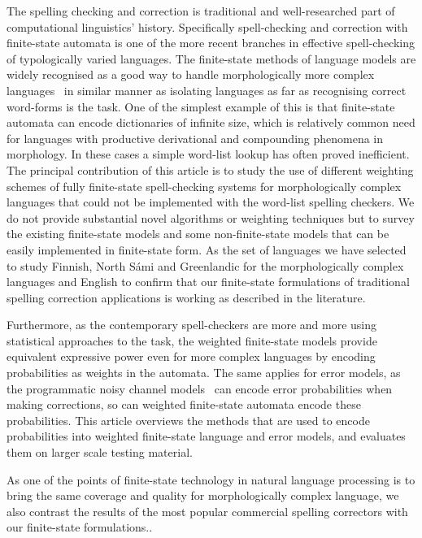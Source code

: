 \documentclass[a4paper,12pt]{article}
\begin{document}
The spelling checking and correction is traditional and well-researched part of
computational linguistics' history. Specifically spell-checking and correction
with finite-state automata is one of the more recent branches in effective
spell-checking of typologically varied languages. The finite-state methods of
language models are widely recognised as a good way to handle morphologically
more complex languages~\cite[]{beesley2003finite} in similar manner as
isolating languages as far as recognising correct word-forms is the task. One
of the simplest example of this is that finite-state automata can encode
dictionaries of infinite size, which is relatively common need for languages
with productive derivational and compounding phenomena in morphology.  In these
cases a simple word-list lookup has often proved inefficient. The principal
contribution of this article is to study the use of different weighting schemes
of fully finite-state spell-checking systems for morphologically complex
languages that could not be implemented with the word-list spelling checkers.
We do not provide substantial novel algorithms or weighting techniques but to
survey the existing finite-state models and some non-finite-state models that
can be easily implemented in finite-state form. As the set of languages we have
selected to study Finnish, North Sámi and Greenlandic for the morphologically
complex languages and English to confirm that our finite-state formulations of
traditional spelling correction applications is working as described in the
literature.

Furthermore, as the contemporary spell-checkers are more and more using
statistical approaches to the task, the weighted finite-state models provide
equivalent expressive power even for more complex languages by encoding
probabilities as weights in the automata.  The same applies for error models,
as the programmatic noisy channel models~\cite[]{brill2000improved} can encode
error probabilities when making corrections, so can weighted finite-state
automata encode these probabilities. This article overviews the methods that
are used to encode probabilities into weighted finite-state language and error
models, and evaluates them on larger scale testing material.

As one of the
points of finite-state technology in natural language processing is to bring
the same coverage and quality for morphologically complex language, we also
contrast the results of the most popular commercial spelling correctors with
our finite-state formulations..
\end{document}
